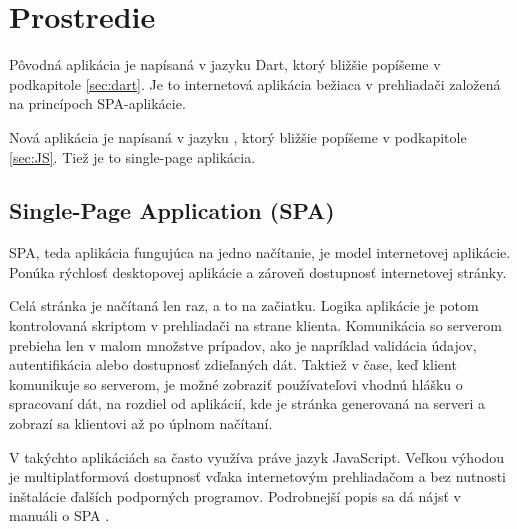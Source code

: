 \chapter{Prostredie}

\label{kap:prostredie} %

Pôvodná aplikácia je napísaná v jazyku Dart, ktorý bližšie popíšeme v podkapitole \ref{sec:dart}. Je to internetová aplikácia bežiaca v prehliadači založená na princípoch SPA-aplikácie.

Nová aplikácia je napísaná v jazyku \JS{}, ktorý bližšie popíšeme v podkapitole \ref{sec:JS}. Tiež je to single-page aplikácia.

\section{Single-Page Application (SPA)}
SPA, teda aplikácia fungujúca na jedno načítanie, je model internetovej aplikácie. Ponúka rýchlosť desktopovej aplikácie a zároveň dostupnosť internetovej stránky.

Celá stránka je načítaná len raz, a to na začiatku. Logika aplikácie je potom kontrolovaná skriptom v prehliadači na strane klienta. 
Komunikácia so serverom prebieha len v malom množstve prípadov, ako je napríklad validácia údajov, autentifikácia alebo dostupnosť zdieľaných dát. 
Taktiež v čase, keď klient komunikuje so serverom, je možné zobraziť používateľovi vhodnú hlášku o spracovaní dát, na rozdiel od aplikácií, kde je stránka generovaná na serveri a zobrazí sa klientovi až po úplnom načítaní.

V takýchto aplikáciách sa často využíva práve jazyk JavaScript. Veľkou výhodou je multiplatformová dostupnosť vďaka internetovým prehliadačom a bez nutnosti inštalácie ďalších podporných programov. Podrobnejší popis sa dá nájsť v manuáli o SPA \cite{SPA}.


